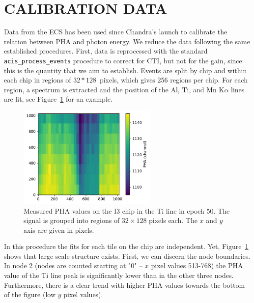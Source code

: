 \documentclass[]{spie}  %
\begin{document}
\section{CALIBRATION DATA}
Data from the ECS has been used since Chandra's launch to calibrate the relation between PHA and photon energy. We reduce the data following the same established procedures. First, data is reprocessed with the standard \texttt{acis\_process\_events} procedure to correct for CTI, but not for the gain, since this is the quantity that we aim to establish. Events are split by chip and within each chip in regions of $32*128$~pixels, which gives 256 regions per chip. For each region, a spectrum is extracted and the position of the Al, Ti, and Mn K$\alpha$ lines are fit, see Figure~\ref{fig:example} for an example.
\begin{figure} [ht]
  \begin{center}
    \includegraphics[height=5cm]{figures/i1e50Ti.pdf}
  \end{center}
  \caption
      {Measured PHA values on the I3 chip in the Ti line in epoch 50. The signal is grouped into regions of $32 \times 128$ pixels each. The $x$ and $y$ axis are given in pixels.\label{fig:example}
}
\end{figure}
In this procedure the fits for each tile on the chip are independent. Yet, Figure~\ref{fig:example} shows that large scale structure exists. First, we can discern the node boundaries. In node 2 (nodes are counted starting at "0" -- $x$ pixel values 513-768) the PHA value of the Ti line peak is significantly lower than in the other three nodes. Furthermore, there is a clear trend with higher PHA values towards the bottom of the figure (low $y$ pixel values).
\end{document}

